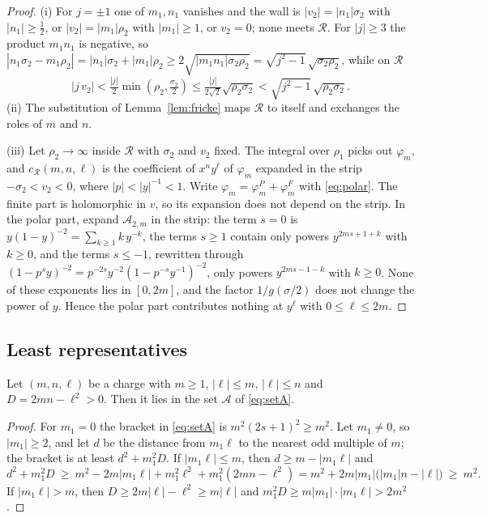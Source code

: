 \begin{proof}
(i) For $j=\pm1$ one of $m_1,n_1$ vanishes and the wall is $|v_2|=|n_1|\sigma_2$ with $|n_1|\ge\frac12$, or $|v_2|=|m_1|\rho_2$ with $|m_1|\ge1$, or $v_2=0$; none meets $\mathcal R$. For $|j|\ge3$ the product $m_1n_1$ is negative, so $|n_1\sigma_2-m_1\rho_2|=|n_1|\sigma_2+|m_1|\rho_2\ge2\sqrt{|m_1n_1|\sigma_2\rho_2}=\sqrt{j^2-1}\,\sqrt{\sigma_2\rho_2}$, while on $\mathcal R$
\[
|j\,v_2|<\tfrac{|j|}2\min(\rho_2,\tfrac{\sigma_2}2)\le\tfrac{|j|}{2\sqrt2}\sqrt{\rho_2\sigma_2}<\sqrt{j^2-1}\,\sqrt{\rho_2\sigma_2}.
\]
(ii) The substitution of Lemma~\ref{lem:fricke} maps $\mathcal R$ to itself and exchanges the roles of $m$ and $n$.

(iii) Let $\rho_2\to\infty$ inside $\mathcal R$ with $\sigma_2$ and $v_2$ fixed. The integral over $\rho_1$ picks out $\varphi_m$, and $c_{\mathcal R}(m,n,\ell)$ is the coefficient of $x^ny^\ell$ of $\varphi_m$ expanded in the strip $-\sigma_2<v_2<0$, where $|p|<|y|^{-1}<1$. Write $\varphi_m=\varphi^P_m+\varphi^F_m$ with \eqref{eq:polar}. The finite part is holomorphic in $v$, so its expansion does not depend on the strip. In the polar part, expand $\mathcal A_{2,m}$ in the strip: the term $s=0$ is $y(1-y)^{-2}=\sum_{k\ge1}k\,y^{-k}$, the terms $s\ge1$ contain only powers $y^{2ms+1+k}$ with $k\ge0$, and the terms $s\le-1$, rewritten through $(1-p^sy)^{-2}=p^{-2s}y^{-2}(1-p^{-s}y^{-1})^{-2}$, only powers $y^{2ms-1-k}$ with $k\ge0$. None of these exponents lies in $[0,2m]$, and the factor $1/g(\sigma/2)$ does not change the power of $y$. Hence the polar part contributes nothing at $y^\ell$ with $0\le\ell\le2m$.
\end{proof}

\subsection{Least representatives}
\begin{lemma}\label{lem:leastA}
Let $(m,n,\ell)$ be a charge with $m\ge1$, $|\ell|\le m$, $|\ell|\le n$ and $D=2mn-\ell^2>0$. Then it lies in the set $\mathcal A$ of \eqref{eq:setA}.
\end{lemma}

\begin{proof}
For $m_1=0$ the bracket in \eqref{eq:setA} is $m^2(2s+1)^2\ge m^2$. Let $m_1\ne0$, so $|m_1|\ge2$, and let $d$ be the distance from $m_1\ell$ to the nearest odd multiple of $m$; the bracket is at least $d^2+m_1^2D$. If $|m_1\ell|\le m$, then $d\ge m-|m_1\ell|$ and
\[
d^2+m_1^2D\ \ge\ m^2-2m|m_1\ell|+m_1^2\ell^2+m_1^2(2mn-\ell^2)=m^2+2m|m_1|\big(|m_1|n-|\ell|\big)\ \ge\ m^2 .
\]
If $|m_1\ell|>m$, then $D\ge2m|\ell|-\ell^2\ge m|\ell|$ and $m_1^2D\ge m|m_1|\cdot|m_1\ell|>2m^2$.
\end{proof}

